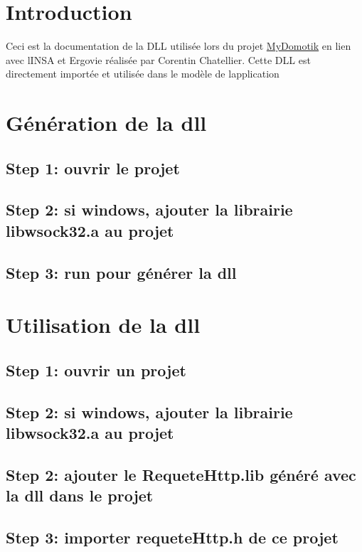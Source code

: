 \hypertarget{index_intro_sec}{}\section{Introduction}\label{index_intro_sec}
Ceci est la documentation de la D\+LL utilisée lors du projet \hyperlink{namespace_my_domotik}{My\+Domotik} en lien avec l\textquotesingle{}I\+N\+SA et Ergovie réalisée par Corentin Chatellier. Cette D\+LL est directement importée et utilisée dans le modèle de l\textquotesingle{}application\hypertarget{index_install_sec}{}\section{Génération de la dll}\label{index_install_sec}
\hypertarget{index_step1}{}\subsection{Step 1\+: ouvrir le projet}\label{index_step1}
\hypertarget{index_step2}{}\subsection{Step 2\+: si windows, ajouter la librairie libwsock32.\+a au projet}\label{index_step2}
\hypertarget{index_step3}{}\subsection{Step 3\+: run pour générer la dll}\label{index_step3}
\hypertarget{index_use_sec}{}\section{Utilisation de la dll}\label{index_use_sec}
\hypertarget{index_step21}{}\subsection{Step 1\+: ouvrir un projet}\label{index_step21}
\hypertarget{index_step222}{}\subsection{Step 2\+: si windows, ajouter la librairie libwsock32.\+a au projet}\label{index_step222}
\hypertarget{index_step22}{}\subsection{Step 2\+: ajouter le Requete\+Http.\+lib généré avec la dll dans le projet}\label{index_step22}
\hypertarget{index_step23}{}\subsection{Step 3\+: importer requete\+Http.\+h de ce projet}\label{index_step23}
